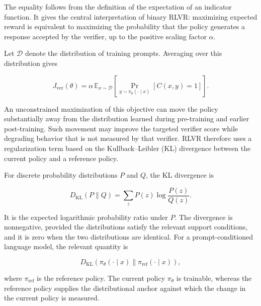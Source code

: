 The equality follows from the definition of the expectation of an indicator
function. It gives the central interpretation of binary RLVR: maximizing
expected reward is equivalent to maximizing the probability that the policy
generates a response accepted by the verifier, up to the positive scaling
factor \(\alpha\).

Let \(\mathcal{D}\) denote the distribution of training prompts. Averaging
over this distribution gives

\begin{equation}
    J_{\mathrm{ver}}(\theta)
    =
    \alpha\,
    \mathbb{E}_{x\sim\mathcal{D}}
    \left[
        \Pr_{y\sim\pi_\theta(\cdot\mid x)}
        [C(x,y)=1]
    \right].
    \label{eq:rlvr-verification-objective}
\end{equation}

An unconstrained maximization of this objective can move the policy
substantially away from the distribution learned during pre-training and
earlier post-training. Such movement may improve the targeted verifier score
while degrading behavior that is not measured by that verifier. RLVR
therefore uses a regularization term based on the Kullback--Leibler (KL)
divergence between the current policy and a reference policy.

For discrete probability distributions \(P\) and \(Q\), the KL divergence is

\begin{equation}
    D_{\mathrm{KL}}(P\parallel Q)
    =
    \sum_z P(z)\log\frac{P(z)}{Q(z)}.
    \label{eq:rlvr-kl-definition}
\end{equation}

It is the expected logarithmic probability ratio under \(P\). The divergence
is nonnegative, provided the distributions satisfy the relevant support
conditions, and it is zero when the two distributions are identical. For a
prompt-conditioned language model, the relevant quantity is

\begin{equation}
    D_{\mathrm{KL}}
    \left(
        \pi_\theta(\cdot\mid x)
        \parallel
        \pi_{\mathrm{ref}}(\cdot\mid x)
    \right),
    \label{eq:rlvr-policy-kl}
\end{equation}

where \(\pi_{\mathrm{ref}}\) is the reference policy. The current policy
\(\pi_\theta\) is trainable, whereas the reference policy supplies the
distributional anchor against which the change in the current policy is
measured.


